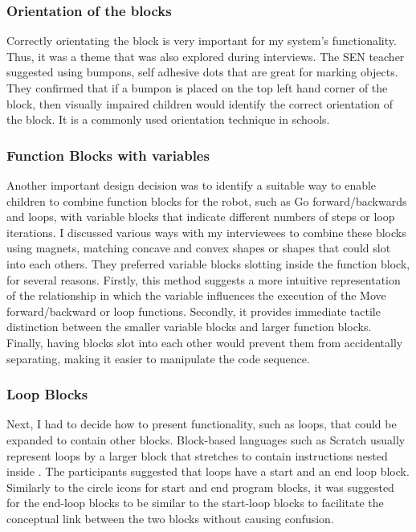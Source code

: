 \documentclass[oneside,%
                    author={Malak Hajji},
                    degree={BSc},
                    title={Designing An Accessible Ozobot Programming Platform for Students},
                  subtitle={With Mixed Visual Abilities}]{dissertation}
\begin{document}
\subsubsection{Orientation of the blocks}
Correctly orientating the block is very important for my system's functionality. Thus, it was a theme that was also explored during interviews. The SEN teacher suggested using bumpons, self adhesive dots that are great for marking objects. They confirmed that if a bumpon is placed on the top left hand corner of the block, then visually impaired children would identify the correct orientation of the block. It is a commonly used orientation technique in schools.

\subsubsection{Function Blocks with variables}
Another important design decision was to identify a suitable way to enable children to combine function blocks for the robot, such as Go forward/backwards and loops, with variable blocks that indicate different numbers of steps or loop iterations. I discussed various ways with my interviewees to combine these blocks using magnets, matching concave and convex shapes or shapes that could slot into each others. They preferred variable blocks slotting inside the function block, for several reasons. Firstly, this method suggests a more intuitive representation of the relationship in which the variable influences the execution of the Move forward/backward or loop functions. Secondly, it provides immediate tactile distinction between the smaller variable blocks and larger function blocks. Finally, having blocks slot into each other would prevent them from accidentally separating, making it easier to manipulate the code sequence.

\subsubsection{Loop Blocks}
Next, I had to decide how to present functionality, such as loops, that could be expanded to contain other blocks.  Block-based languages such as Scratch usually represent loops by a larger block that stretches to contain instructions nested inside \cite{scratch}.
The participants suggested that loops have a start and an end loop block. Similarly to the circle icons for start and end program blocks, it was suggested for the end-loop blocks to be similar to the start-loop blocks to facilitate the conceptual link between the two blocks without causing confusion.
\end{document}
